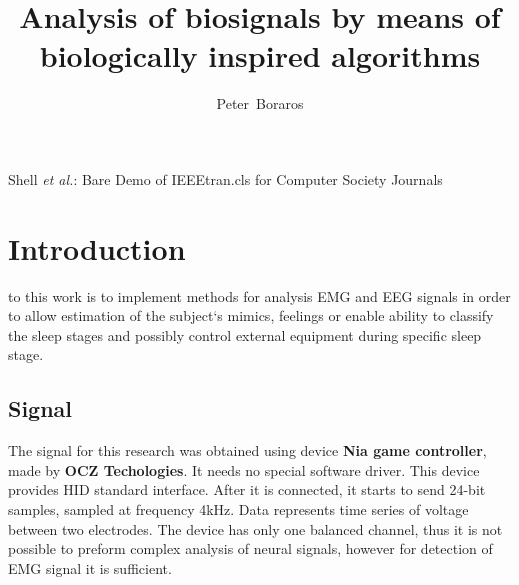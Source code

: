 \documentclass[a4paper,journal]{IEEEtran}
\begin{document}
\title{Analysis of biosignals by means of\\ biologically inspired algorithms}

\author{Peter~Boraros%
}



%
{Shell \MakeLowercase{\textit{et al.}}: Bare Demo of IEEEtran.cls for Computer Society Journals}


\maketitle
\IEEEdisplaynotcompsoctitleabstractindextext
\IEEEpeerreviewmaketitle


\section{Introduction}
 to this work is to implement methods for analysis 
EMG and EEG signals in order to allow estimation of the subject`s mimics, 
feelings or enable ability to classify the sleep stages and possibly control 
external equipment during specific sleep stage.

\subsection{Signal}
The signal for this research was obtained using device 
\textbf{Nia game controller}, made by 
\textbf{OCZ Techologies}.
It needs no special software driver.
This device provides HID standard interface.
After it is connected, it starts to send 24-bit samples, 
sampled at frequency 4kHz. 
Data represents time series of voltage between two electrodes.
The device has only one balanced channel, thus 
it is not possible to preform complex analysis of neural signals,
however for detection of EMG signal it is sufficient.
\end{document}

